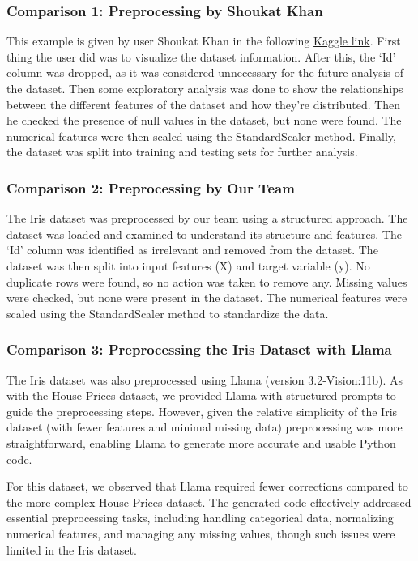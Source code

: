 \subsubsection{Comparison 1: Preprocessing by Shoukat Khan}
This example is given by user Shoukat Khan in the following
\href{https://www.kaggle.com/code/drisrarahmad/iris-flower-dataset}{Kaggle
    link}. First thing the user did was to visualize the dataset information. After
this, the `Id' column was dropped, as it was considered unnecessary for the
future analysis of the dataset. Then some exploratory analysis was done to show
the relationships between the different features of the dataset and how they're
distributed. Then he checked the presence of null values in the dataset, but
none were found. The numerical features were then scaled using the
StandardScaler method. Finally, the dataset was split into training and testing
sets for further analysis.

\subsubsection{Comparison 2: Preprocessing by Our Team}
The Iris dataset was preprocessed by our team using a structured approach. The
dataset was loaded and examined to understand its structure and features. The
`Id' column was identified as irrelevant and removed from the dataset. The
dataset was then split into input features (X) and target variable (y). No
duplicate rows were found, so no action was taken to remove any. Missing values
were checked, but none were present in the dataset. The numerical features were
scaled using the StandardScaler method to standardize the data.

\subsubsection{Comparison 3: Preprocessing the Iris Dataset with Llama}

The Iris dataset was also preprocessed using Llama (version 3.2-Vision:11b). As
with the House Prices dataset, we provided Llama with structured prompts to
guide the preprocessing steps. However, given the relative simplicity of the
Iris dataset (with fewer features and minimal missing data) preprocessing was
more straightforward, enabling Llama to generate more accurate and usable
Python code.

For this dataset, we observed that Llama required fewer corrections compared to
the more complex House Prices dataset. The generated code effectively addressed
essential preprocessing tasks, including handling categorical data, normalizing
numerical features, and managing any missing values, though such issues were
limited in the Iris dataset.


